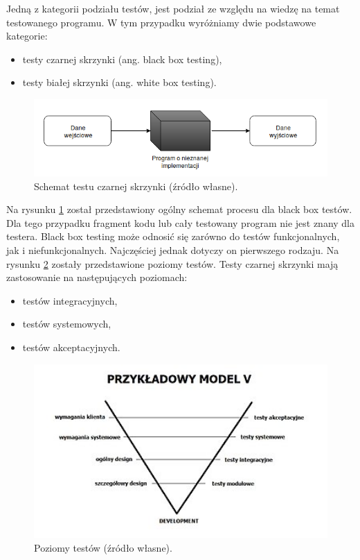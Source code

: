 Jedną z kategorii podziału testów, jest podział ze względu na wiedzę na temat testowanego programu.
W tym przypadku wyróżniamy dwie podstawowe kategorie:
\begin{itemize}
\item testy czarnej skrzynki (ang. black box testing),
\item testy białej skrzynki (ang. white box testing).
\end{itemize}

\begin{figure}[h]
    \centering
    \includegraphics[width = 13cm]{chapter01/black-box.png}
    \caption{Schemat testu czarnej skrzynki (źródło własne).}
    \label{fig:black-box}
\end{figure}

Na rysunku \ref{fig:black-box} został przedstawiony ogólny schemat procesu dla black box testów.
Dla tego przypadku fragment kodu lub cały testowany program nie jest znany dla testera.
Black box testing może odnosić się zarówno do testów funkcjonalnych, jak i niefunkcjonalnych.
Najczęściej jednak dotyczy on pierwszego rodzaju.
Na rysunku \ref{fig:tests-levels} zostały przedstawione poziomy testów.
Testy czarnej skrzynki mają zastosowanie na następujących poziomach:
\begin{itemize}
\item testów integracyjnych,
\item testów systemowych,
\item testów akceptacyjnych.
\end{itemize}

\begin{figure}[h]
    \centering
    \includegraphics[width = 13cm]{chapter01/tests_levels.jpg}
    \caption{Poziomy testów (źródło własne).}
    \label{fig:tests-levels}
\end{figure}

